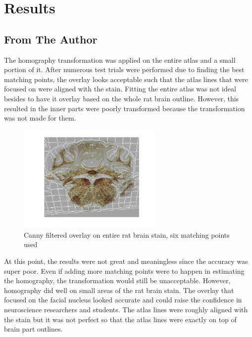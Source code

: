 \documentclass[10pt,twocolumn]{article}
\begin{document}
\section{Results}
\subsection{From The Author}
The homography transformation was applied on the entire atlas and a small portion of it. After numerous test trials were performed due to finding the best matching points, the overlay looks acceptable such that the atlas lines that were focused on were aligned with the stain. Fitting the entire atlas was not ideal besides to have it overlay based on the whole rat brain outline. However, this resulted in the inner parts were poorly transformed because the transformation was not made for them. 

\begin{figure}[htp]
    \centering
    \includegraphics[width=7cm]{result_e.jpg}
    \caption{Canny filtered overlay on entire rat brain stain, six matching points used}
\end{figure}

At this point, the results were not great and meaningless since the accuracy was super poor. Even if adding more matching points were to happen in estimating the homography, the transformation would still be unacceptable. However, homography did well on small areas of the rat brain stain. The overlay that focused on the facial nucleus looked accurate and could raise the confidence in neuroscience researchers and students. The atlas lines were roughly aligned with the stain but it was not perfect so that the atlas lines were exactly on top of brain part outlines. 
\end{document}
